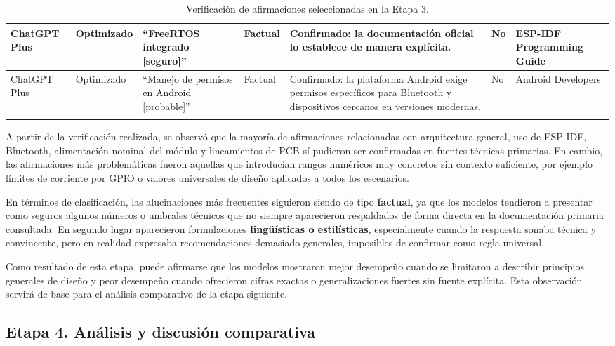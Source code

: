 \documentclass[11pt,a4paper]{article}
\begin{document}
\begin{landscape}
\begin{longtable}{|P{2.2cm}|P{1.8cm}|P{5.7cm}|P{2.2cm}|P{5.3cm}|P{2.0cm}|P{3.9cm}|}
ChatGPT Plus & Optimizado & ``FreeRTOS integrado [seguro]'' & Factual & Confirmado: la documentación oficial lo establece de manera explícita. & No & ESP-IDF Programming Guide \\
\hline

ChatGPT Plus & Optimizado & ``Manejo de permisos en Android [probable]'' & Factual & Confirmado: la plataforma Android exige permisos específicos para Bluetooth y dispositivos cercanos en versiones modernas. & No & Android Developers \\
\hline

\caption{Verificación de afirmaciones seleccionadas en la Etapa 3.}
\label{tab:verificacion_bdi}
\end{longtable}
\setlength{\tabcolsep}{6pt}
\end{landscape}
\normalsize 

A partir de la verificación realizada, se observó que la mayoría de afirmaciones relacionadas con arquitectura general, uso de ESP-IDF, Bluetooth, alimentación nominal del módulo y lineamientos de PCB sí pudieron ser confirmadas en fuentes técnicas primarias. En cambio, las afirmaciones más problemáticas fueron aquellas que introducían rangos numéricos muy concretos sin contexto suficiente, por ejemplo límites de corriente por GPIO o valores universales de diseño aplicados a todos los escenarios.

En términos de clasificación, las alucinaciones más frecuentes siguieron siendo de tipo \textbf{factual}, ya que los modelos tendieron a presentar como seguros algunos números o umbrales técnicos que no siempre aparecieron respaldados de forma directa en la documentación primaria consultada. En segundo lugar aparecieron formulaciones \textbf{lingüísticas o estilísticas}, especialmente cuando la respuesta sonaba técnica y convincente, pero en realidad expresaba recomendaciones demasiado generales, imposibles de confirmar como regla universal.

Como resultado de esta etapa, puede afirmarse que los modelos mostraron mejor desempeño cuando se limitaron a describir principios generales de diseño y peor desempeño cuando ofrecieron cifras exactas o generalizaciones fuertes sin fuente explícita. Esta observación servirá de base para el análisis comparativo de la etapa siguiente.





\subsection{Etapa 4. Análisis y discusión comparativa}
\end{document}
